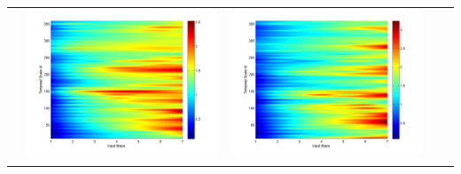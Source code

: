 \documentclass[11pt]{article}
\begin{document}
\begin{table}[H]
{\begin{tabular}{ccccc}
&\begin{minipage}{.3\textwidth}\includegraphics[width=\linewidth]{resultgraph/05585000pep.png}\end{minipage}
&\begin{minipage}{.3\textwidth}\includegraphics[width=\linewidth]{resultgraph/05585000pepq.png}\end{minipage}
\\
&

\end{tabular}}
\end{table}
\end{document}
